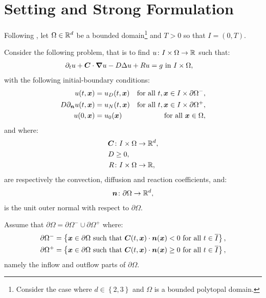 \section{Setting and Strong Formulation}

Following \cite{Feistauer2004}, let $\Omega \in \mathbb{R}^{d}$ be a bounded domain\footnote{Consider the case where $d \in \left\{ 2, 3 \right\}$ and $\Omega$ is a bounded polytopal domain.} and $T > 0$ so that $I = \left( 0, T\right)$.

Consider the following problem, that is to find $u \colon I \times \Omega \rightarrow \mathbb{R}$ such that:
\begin{align}
    \partial_t u + \bm{C} \cdot \bm{\nabla} u - D \Delta u + R u = g &\text{ in } I \times \Omega, \label{equation:cdr}
\end{align}
with the following initial-boundary conditions:
\begin{align}
    u(t, \bm{x}) &= u_D(t, \bm{x}) &\text{for all } t, \bm{x} \in I \times \partial \Omega^-, \label{equation:cdr_dirichlet} \\
    D \partial_{\bm{n}} u(t, \bm{x}) &= u_N(t, \bm{x}) &\text{for all } t, \bm{x} \in I \times \partial \Omega^+, \label{equation:cdr_neumann} \\
    u(0, \bm{x}) &= u_0(\bm{x}) &\text{for all } \bm{x} \in \Omega, \label{equation:cdr_initial}
\end{align}
and where:
\begin{align}
    \bm{C} & \colon I \times \Omega \rightarrow \mathbb{R}^{d}, \\
    D & \geq 0, \\
    R & \colon I \times \Omega \rightarrow \mathbb{R},
\end{align}
are respectively the convection, diffusion and reaction coefficients, and:
\begin{align}
    \bm{n} \colon \partial \Omega \rightarrow \mathbb{R}^{d},
\end{align}
is the unit outer normal with respect to $\partial \Omega$.

Assume that $\partial \Omega = \partial \Omega^- \cup \partial \Omega^+$ where:
\begin{align}
    \partial \Omega^- = \left\{ \bm{x} \in \partial \Omega \text{ such that } \bm{C}(t, \bm{x}) \cdot \bm{n}(\bm{x}) < 0 \text{ for all } t \in \overline{I} \right\}, \\
    \partial \Omega^+ = \left\{ \bm{x} \in \partial \Omega \text{ such that } \bm{C}(t, \bm{x}) \cdot \bm{n}(\bm{x}) \geq 0 \text{ for all } t \in \overline{I} \right\},
\end{align}
namely the inflow and outflow parts of $\partial \Omega$.

